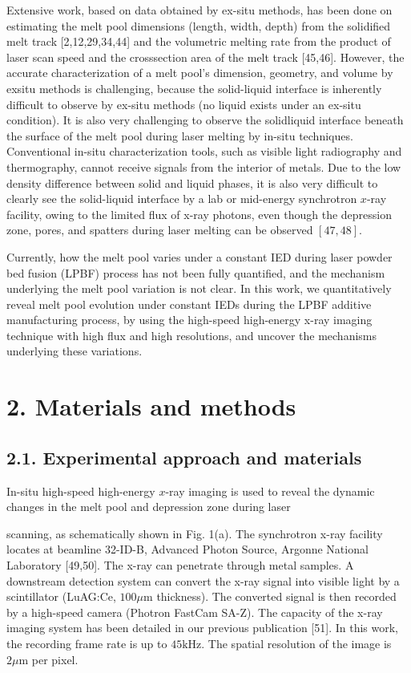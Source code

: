 \documentclass[10pt]{article}
\begin{document}
Extensive work, based on data obtained by ex-situ methods, has been done on estimating the melt pool dimensions (length, width, depth) from the solidified melt track [2,12,29,34,44] and the volumetric melting rate from the product of laser scan speed and the crosssection area of the melt track [45,46]. However, the accurate characterization of a melt pool's dimension, geometry, and volume by exsitu methods is challenging, because the solid-liquid interface is inherently difficult to observe by ex-situ methods (no liquid exists under an ex-situ condition). It is also very challenging to observe the solidliquid interface beneath the surface of the melt pool during laser melting by in-situ techniques. Conventional in-situ characterization tools, such as visible light radiography and thermography, cannot receive signals from the interior of metals. Due to the low density difference between solid and liquid phases, it is also very difficult to clearly see the solid-liquid interface by a lab or mid-energy synchrotron $x$-ray facility, owing to the limited flux of x-ray photons, even though the depression zone, pores, and spatters during laser melting can be observed $[47,48]$.

Currently, how the melt pool varies under a constant IED during laser powder bed fusion (LPBF) process has not been fully quantified, and the mechanism underlying the melt pool variation is not clear. In this work, we quantitatively reveal melt pool evolution under constant IEDs during the LPBF additive manufacturing process, by using the high-speed high-energy x-ray imaging technique with high flux and high resolutions, and uncover the mechanisms underlying these variations.

\section*{2. Materials and methods}
\subsection*{2.1. Experimental approach and materials}
In-situ high-speed high-energy $x$-ray imaging is used to reveal the dynamic changes in the melt pool and depression zone during laser

scanning, as schematically shown in Fig. 1(a). The synchrotron x-ray facility locates at beamline 32-ID-B, Advanced Photon Source, Argonne National Laboratory [49,50]. The x-ray can penetrate through metal samples. A downstream detection system can convert the x-ray signal into visible light by a scintillator (LuAG:Ce, $100 \mu \mathrm{m}$ thickness). The converted signal is then recorded by a high-speed camera (Photron FastCam SA-Z). The capacity of the x-ray imaging system has been detailed in our previous publication [51]. In this work, the recording frame rate is up to $45 \mathrm{kHz}$. The spatial resolution of the image is $2 \mu \mathrm{m}$ per pixel.
\end{document}
